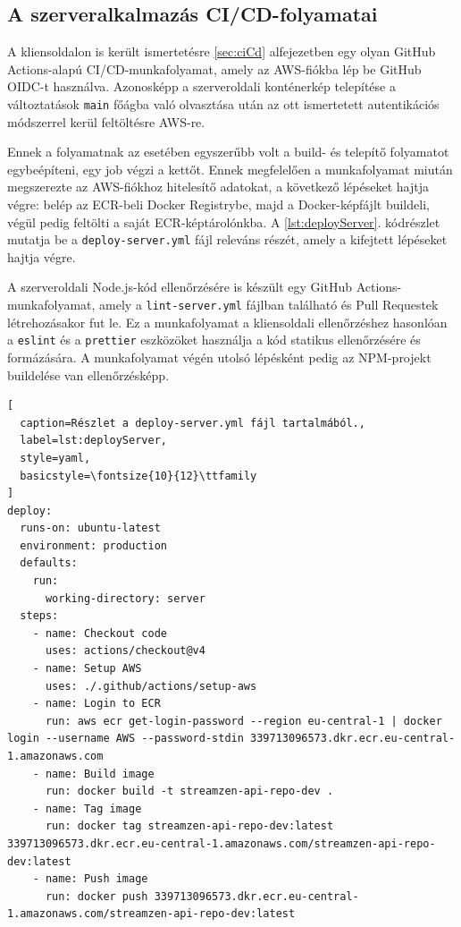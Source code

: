 \subsection{A szerveralkalmazás CI/CD-folyamatai}

A kliensoldalon is került ismertetésre \ref{sec:ciCd} alfejezetben egy olyan GitHub Actions-alapú CI/CD-munkafolyamat, amely az AWS-fiókba lép be GitHub OIDC-t használva. Azonosképp a szerveroldali konténerkép telepítése a változtatások \verb|main| főágba való olvasztása után az ott ismertetett autentikációs módszerrel kerül feltöltésre AWS-re.

Ennek a folyamatnak az esetében egyszerűbb volt a build- és telepítő folyamatot egybeépíteni, egy job végzi a kettőt. Ennek megfelelően a munkafolyamat miután megszerezte az AWS-fiókhoz hitelesítő adatokat, a következő lépéseket hajtja végre: belép az ECR-beli Docker Registrybe, majd a Docker-képfájlt buildeli, végül pedig feltölti a saját ECR-képtárolónkba. A \ref{lst:deployServer}. kódrészlet mutatja be a \verb|deploy-server.yml| fájl releváns részét, amely a kifejtett lépéseket hajtja végre.

A szerveroldali Node.js-kód ellenőrzésére is készült egy GitHub Actions-munkafolyamat, amely a \verb|lint-server.yml| fájlban található és Pull Requestek létrehozásakor fut le. Ez a munkafolyamat a kliensoldali ellenőrzéshez hasonlóan a \verb|eslint| és a \verb|prettier| eszközöket használja a kód statikus ellenőrzésére és formázására. A munkafolyamat végén utolsó lépésként pedig az NPM-projekt buildelése van ellenőrzésképp.

\begin{minipage}{0.92\textwidth}
  \begin{lstlisting}[
  caption=Részlet a deploy-server.yml fájl tartalmából.,
  label=lst:deployServer,
  style=yaml,
  basicstyle=\fontsize{10}{12}\ttfamily
]
deploy:
  runs-on: ubuntu-latest
  environment: production
  defaults:
    run:
      working-directory: server
  steps:
    - name: Checkout code
      uses: actions/checkout@v4
    - name: Setup AWS
      uses: ./.github/actions/setup-aws
    - name: Login to ECR
      run: aws ecr get-login-password --region eu-central-1 | docker login --username AWS --password-stdin 339713096573.dkr.ecr.eu-central-1.amazonaws.com
    - name: Build image
      run: docker build -t streamzen-api-repo-dev .
    - name: Tag image
      run: docker tag streamzen-api-repo-dev:latest 339713096573.dkr.ecr.eu-central-1.amazonaws.com/streamzen-api-repo-dev:latest
    - name: Push image
      run: docker push 339713096573.dkr.ecr.eu-central-1.amazonaws.com/streamzen-api-repo-dev:latest
\end{lstlisting}
\end{minipage}

